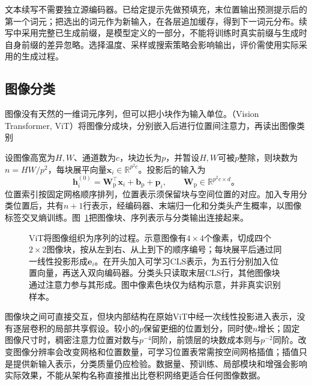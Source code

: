 文本续写不需要独立源编码器。已给定提示先做预填充，末位置输出预测提示后的第一个词元；把选出的词元作为新输入，在各层追加缓存，得到下一词元分布。续写中采用完整已生成前缀，是模型定义的一部分，不能将训练时真实前缀与生成时自身前缀的差异忽略。选择温度、采样或搜索策略会影响输出，评价需使用实际采用的生成过程。

\subsection{图像分类}
\label{sec:transformer-vision-applications}

图像没有天然的一维词元序列，但可以把小块作为输入单位。（Vision Transformer, ViT）将图像分成块，分别嵌入后进行位置间注意力，再读出图像类别

设图像高宽为$H,W$、通道数为$c$，块边长为$p$，并暂设$H,W$可被$p$整除，则块数为$n=HW/p^2$，每块展平向量$\bm x_i\in\mathbb R^{p^2c}$。投影后的输入为
\begin{equation}
  \bm h_i^{(0)}=\bm W_{\mathrm p}^{\top}\bm x_i+\bm b_{\mathrm p}+\bm p_i,
  \qquad \bm W_{\mathrm p}\in\mathbb R^{p^2c\times d}\text{。}
  \label{eq:transformer-vit-input}
\end{equation}
位置索引按固定网格顺序排列，位置表示须保留块与空间位置的对应。加入专用分类位置后，共有$n+1$行表示，经编码器、末端归一化和分类头产生概率，以图像标签交叉熵训练。图~\ref{fig:transformer-vit}把图像块、序列表示与分类输出连接起来。

\begin{figure}[htbp]
  \centering
  
  \caption{ViT将图像组织为序列的过程。示意图像有$4\times4$个像素，切成四个$2\times2$图像块，按从左到右、从上到下的顺序编号；每块展平后通过同一线性投影形成$\bm e_i$。在开头加入可学习CLS表示，为五行分别加入位置向量，再送入双向编码器。分类头只读取末层CLS行，其他图像块通过注意力参与其形成。图中像素色块仅为结构示意，并非真实识别样本。}
  \label{fig:transformer-vit}
\end{figure}
\FloatBarrier

图像块之间可直接交互，但块内部结构在原始ViT中经一次线性投影进入表示，没有逐层卷积的局部共享假设。较小的$p$保留更细的位置划分，同时使$n$增长；固定图像尺寸时，稠密注意力位置对数与$p^{-4}$同阶，前馈层的块数成本则与$p^{-2}$同阶。改变图像分辨率会改变网格和位置数量，可学习位置表常需按空间网格插值；插值只是提供新输入表示，分类质量仍应检验。数据量、预训练、局部模块和增强会影响实际效果，不能从架构名称直接推出比卷积网络更适合任何图像数据。

\Needspace{125mm}
